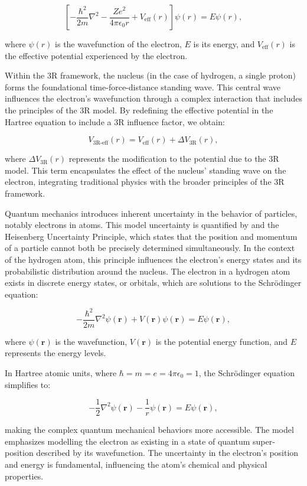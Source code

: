 \documentclass[12pt]{article}
\begin{document}
\[
    \left[ -\frac{\hbar^2}{2m}\nabla^2 - \frac{Ze^2}{4\pi\epsilon_0 r} + V_{\text{eff}}(r) \right] \psi(r) = E\psi(r),
\]

where \(\psi(r)\) is the wavefunction of the electron, \(E\) is its energy, and \(V_{\text{eff}}(r)\) is the effective potential experienced by the electron.

Within the 3R framework, the nucleus (in the case of hydrogen, a single proton) forms the foundational time-force-distance standing wave. This central wave influences the electron's wavefunction through a complex interaction that includes the principles of the 3R model. By redefining the effective potential in the Hartree equation to include a 3R influence factor, we obtain:

\[
    V_{\text{3R-eff}}(r) = V_{\text{eff}}(r) + \Delta V_{\text{3R}}(r),
\]

where \(\Delta V_{\text{3R}}(r)\) represents the modification to the potential due to the 3R model. This term encapsulates the effect of the nucleus' standing wave on the electron, integrating traditional physics with the broader principles of the 3R framework.

Quantum mechanics introduces inherent uncertainty in the behavior of particles, notably electrons in atoms. This model uncertainty is quantified by \qbit{} and the Heisenberg Uncertainty Principle, which states that the position and momentum of a particle cannot both be precisely determined simultaneously. In the context of the hydrogen atom, this principle influences the electron's energy states and its probabilistic distribution around the nucleus. The electron in a hydrogen atom exists in discrete energy states, or orbitals, which are solutions to the Schrödinger equation:

\[
    -\frac{\hbar^2}{2m}\nabla^2 \psi(\mathbf{r}) + V(\mathbf{r})\psi(\mathbf{r}) = E\psi(\mathbf{r}),
\]

where \(\psi(\mathbf{r})\) is the wavefunction, \(V(\mathbf{r})\) is the potential energy function, and \(E\) represents the energy levels.

In Hartree atomic units, where \(\hbar = m = e = 4\pi\epsilon_0 = 1\), the Schrödinger equation simplifies to:

\[
    -\frac{1}{2}\nabla^2 \psi(\mathbf{r}) - \frac{1}{r}\psi(\mathbf{r}) = E\psi(\mathbf{r}),
\]

making the complex quantum mechanical behaviors more accessible. The \iR{} model emphasizes modelling the electron as existing in a state of quantum super-position described by its wavefunction. The uncertainty in the electron's position and energy is fundamental, influencing the atom's chemical and physical properties.
\end{document}
